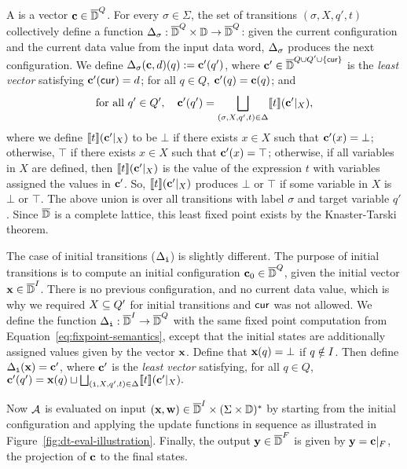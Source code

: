 A  is a vector $\textbf{c} \in \overline{\mathbb{D}{}}^Q$.
For every $\sigma \in \Sigma$, the set of transitions $(\sigma, X, q', t)$
collectively define a function $\Delta_\sigma : \overline{\mathbb{D}{}}^Q \times \mathbb{D} \to \overline{\mathbb{D}{}}^Q$:
given the current configuration and the current data value from the input data word,
$\Delta_\sigma$ produces the next configuration.
We define $\Delta_\sigma(\textbf{c},d)(q) := \textbf{c}'(q')$,
where $\textbf{c}' \in \overline{\mathbb{D}{}}^{Q \cup Q' \cup \{\mathsf{cur}\}}$ is the \emph{least vector} satisfying
$\textbf{c}'(\mathsf{cur}) = d$; for all $q \in Q$, $\textbf{c}'(q) = \textbf{c}(q)$;
and
\begin{equation}
\text{for all }q' \in Q',\quad
\textbf{c}'(q') = \bigsqcup_{(\sigma, X, q', t) \in \Delta} \llbracket t \rrbracket(\textbf{c}'|_X),
\label{eq:fixpoint-semantics}
\end{equation}
where we define $\llbracket t \rrbracket(\textbf{c}'|_X)$ to be $\bot$ if there exists $x \in X$ such that $\textbf{c}'(x) = \bot$; otherwise, $\top$ if there exists $x \in X$ such that $\textbf{c}'(x) = \top$; otherwise, if all variables in $X$ are defined, then $\llbracket t \rrbracket(\textbf{c}'|_X)$ is the value of the expression $t$ with variables assigned the values in $\textbf{c}'$.
So, $\llbracket t \rrbracket(\textbf{c}'|_X)$ produces $\bot$ or $\top$ if some variable in $X$ is $\bot$ or $\top$.
The above union is over all transitions with label $\sigma$ and target variable $q'$.
Since $\overline{\mathbb{D}{}}$ is a complete lattice, this least fixed point exists by the Knaster-Tarski theorem.

The case of initial transitions ($\Delta_{\texttt{i}}$) is slightly different. The purpose of initial transitions is to compute an initial configuration $\textbf{c}_0 \in \overline{\mathbb{D}{}}^{Q}$, given the initial vector $\textbf{x} \in \overline{\mathbb{D}{}}^I$. There is no previous configuration, and no current data value, which is why we required $X \subseteq Q'$ for initial transitions and $\mathsf{cur}$ was not allowed. 
We define the function $\Delta_{\texttt{i}}: \overline{\mathbb{D}{}}^I \to \overline{\mathbb{D}{}}^Q$ with the same fixed point computation from Equation~\eqref{eq:fixpoint-semantics}, except that the initial states are additionally assigned values given by the vector $\textbf{x}$. Define that $\textbf{x}(q) = \bot$ if $q \notin I$. Then define $\Delta_{\texttt{i}}(\textbf{x}) = \textbf{c}'$, where $\textbf{c}'$ is the \emph{least vector} satisfying, for all $q \in Q$,
$\textbf{c}'(q') = \textbf{x}(q) \sqcup \bigsqcup_{(\texttt{i}, X, q', t) \in \Delta} \llbracket t \rrbracket(\textbf{c}'|_X).$

Now $\mathcal{A}$ is evaluated on input
$(\textbf{x}, \textbf{w}) \in \overline{\mathbb{D}{}}^I \times (\Sigma \times \mathbb{D})^*$
by starting from the initial configuration and applying the update functions in sequence as illustrated in
Figure~\ref{fig:dt-eval-illustration}.
Finally, the output $\textbf{y} \in \overline{\mathbb{D}{}}^F$ is given by $\textbf{y} = \textbf{c}|_{F}$, the projection of $\textbf{c}$ to the final states.

